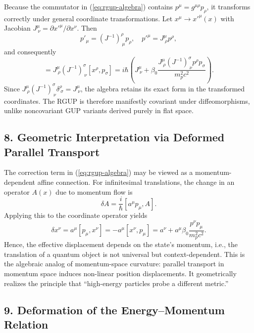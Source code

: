 \documentclass[11pt,oneside]{book}
\numberwithin{equation}{chapter}
\newcommand{\mpx}{m_p}               %
\newcommand{\betaz}{\beta_0}
\begin{document}
Because the commutator in (\ref{eq:rgup-algebra}) contains $p^\mu=g^{\mu\rho}p_\rho$,
it transforms correctly under general coordinate transformations.
Let $x^\mu \rightarrow x'^\mu(x)$ with Jacobian $J^\mu_{\ \nu}=\partial x'^\mu/\partial x^\nu$.
Then
\begin{equation}
p'_\mu = (J^{-1})^\rho_{\ \mu}p_\rho,
\quad
p'^\mu = J^\mu_{\ \rho}p^\rho,
\end{equation}
and consequently
\begin{equation}
[x'^\mu,p'_\nu]
=
J^\mu_{\ \rho}(J^{-1})^\sigma_{\ \nu}
[x^\rho,p_\sigma]
=
i\hbar\left(J^\mu_{\ \nu}+\betaz
\frac{J^\mu_{\ \rho}(J^{-1})^\sigma_{\ \nu}p^\rho p_\sigma}{\mpx^2 c^2}\right).
\end{equation}
Since $J^\mu_{\ \rho}(J^{-1})^\sigma_{\ \nu}\delta^\rho_{\ \sigma}=J^\mu_{\ \nu}$,
the algebra retains its exact form in the transformed coordinates.  
The RGUP is therefore manifestly covariant under diffeomorphisms,
unlike noncovariant GUP variants derived purely in flat space.

\subsection*{8. Geometric Interpretation via Deformed Parallel Transport}

The correction term in (\ref{eq:rgup-algebra}) may be viewed as a momentum-dependent 
affine connection.  
For infinitesimal translations, the change in an operator $A(x)$ due to momentum flow is
\begin{equation}
\delta A = \frac{i}{\hbar}[a^\mu p_\mu, A].
\end{equation}
Applying this to the coordinate operator yields
\begin{equation}
\delta x^\nu = a^\mu [p_\mu,x^\nu]
= -a^\mu [x^\nu,p_\mu]
= a^\nu + a^\mu \betaz\frac{p^\nu p_\mu}{\mpx^2 c^2}.
\end{equation}
Hence, the effective displacement depends on the state’s momentum, i.e.,
the translation of a quantum object is not universal but context-dependent.
This is the algebraic analog of momentum-space curvature:
parallel transport in momentum space induces non-linear position displacements.
It geometrically realizes the principle that ``high-energy particles probe a different metric.''

\subsection*{9. Deformation of the Energy–Momentum Relation}
\end{document}
